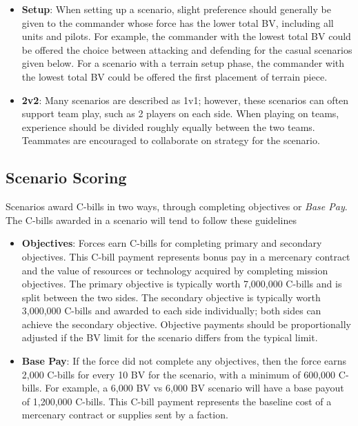 \documentclass{article}
\begin{document}
\begin{itemize}

\item {\bfseries Setup}: When setting up a scenario, slight preference should generally be given to the commander whose force has the lower total BV, including all units and pilots.
For example, the commander with the lowest total BV could be offered the choice between attacking and defending for the casual scenarios given below.
For a scenario with a terrain setup phase, the commander with the lowest total BV could be offered the first placement of terrain piece.

\item {\bfseries 2v2}: Many scenarios are described as 1v1; however, these scenarios can often support team play, such as 2 players on each side.
When playing on teams, experience should be divided roughly equally between the two teams.
Teammates are encouraged to collaborate on strategy for the scenario.

\end{itemize}

\subsection{Scenario Scoring}

Scenarios award C-bills in two ways, through completing objectives or \emph{Base Pay}.
The C-bills awarded in a scenario will tend to follow these guidelines

\begin{itemize}

\item {\bfseries Objectives}: Forces earn C-bills for completing primary and secondary objectives.
This C-bill payment represents bonus pay in a mercenary contract and the value of resources or technology acquired by completing mission objectives.
The primary objective is typically worth 7,000,000 C-bills and is split between the two sides.
The secondary objective is typically worth 3,000,000 C-bills and awarded to each side individually; both sides can achieve the secondary objective.
Objective payments should be proportionally adjusted if the BV limit for the scenario differs from the typical limit.

\item {\bfseries Base Pay}: If the force did not complete any objectives, then the force earns 2,000 C-bills for every 10 BV for the scenario, with a minimum of 600,000 C-bills.
For example, a 6,000 BV vs 6,000 BV scenario will have a base payout of 1,200,000 C-bills.
This C-bill payment represents the baseline cost of a mercenary contract or supplies sent by a faction.

\end{itemize}
\end{document}
